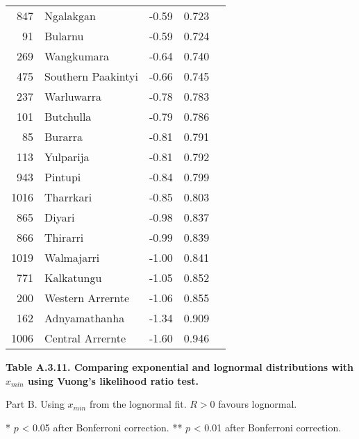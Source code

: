 \begin{longtable}[]{@{}rlrrl@{}}
847 & Ngalakgan & -0.59 & 0.723 &\tabularnewline
91 & Bularnu & -0.59 & 0.724 &\tabularnewline
269 & Wangkumara & -0.64 & 0.740 &\tabularnewline
475 & Southern Paakintyi & -0.66 & 0.745 &\tabularnewline
237 & Warluwarra & -0.78 & 0.783 &\tabularnewline
101 & Butchulla & -0.79 & 0.786 &\tabularnewline
85 & Burarra & -0.81 & 0.791 &\tabularnewline
113 & Yulparija & -0.81 & 0.792 &\tabularnewline
943 & Pintupi & -0.84 & 0.799 &\tabularnewline
1016 & Tharrkari & -0.85 & 0.803 &\tabularnewline
865 & Diyari & -0.98 & 0.837 &\tabularnewline
866 & Thirarri & -0.99 & 0.839 &\tabularnewline
1019 & Walmajarri & -1.00 & 0.841 &\tabularnewline
771 & Kalkatungu & -1.05 & 0.852 &\tabularnewline
200 & Western Arrernte & -1.06 & 0.855 &\tabularnewline
162 & Adnyamathanha & -1.34 & 0.909 &\tabularnewline
1006 & Central Arrernte & -1.60 & 0.946 &\tabularnewline
\bottomrule
\end{longtable}

\newpage

\textbf{Table A.3.11. Comparing exponential and lognormal distributions
with \(x_{min}\) using Vuong's likelihood ratio test.}

Part B. Using \(x_{min}\) from the lognormal fit. \(R > 0\) favours
lognormal.

* \(p\) \textless{} 0.05 after Bonferroni correction. ** \(p\)
\textless{} 0.01 after Bonferroni correction.

